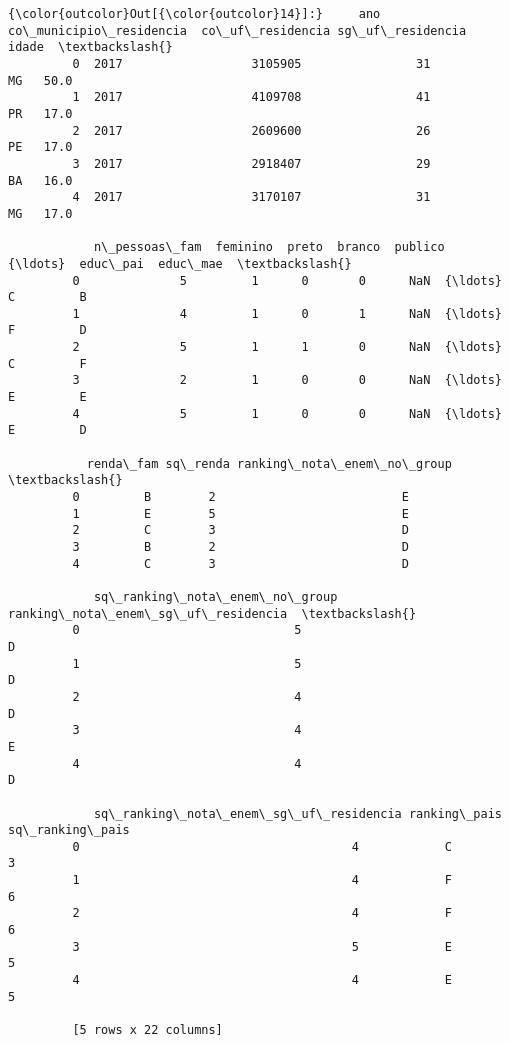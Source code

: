 \documentclass[11pt]{article}
\begin{document}
\begin{Verbatim}[commandchars=\\\{\}]
{\color{outcolor}Out[{\color{outcolor}14}]:}     ano  co\_municipio\_residencia  co\_uf\_residencia sg\_uf\_residencia  idade  \textbackslash{}
         0  2017                  3105905                31               MG   50.0   
         1  2017                  4109708                41               PR   17.0   
         2  2017                  2609600                26               PE   17.0   
         3  2017                  2918407                29               BA   16.0   
         4  2017                  3170107                31               MG   17.0   
         
            n\_pessoas\_fam  feminino  preto  branco  publico  {\ldots}  educ\_pai  educ\_mae  \textbackslash{}
         0              5         1      0       0      NaN  {\ldots}         C         B   
         1              4         1      0       1      NaN  {\ldots}         F         D   
         2              5         1      1       0      NaN  {\ldots}         C         F   
         3              2         1      0       0      NaN  {\ldots}         E         E   
         4              5         1      0       0      NaN  {\ldots}         E         D   
         
           renda\_fam sq\_renda ranking\_nota\_enem\_no\_group  \textbackslash{}
         0         B        2                          E   
         1         E        5                          E   
         2         C        3                          D   
         3         B        2                          D   
         4         C        3                          D   
         
            sq\_ranking\_nota\_enem\_no\_group ranking\_nota\_enem\_sg\_uf\_residencia  \textbackslash{}
         0                              5                                  D   
         1                              5                                  D   
         2                              4                                  D   
         3                              4                                  E   
         4                              4                                  D   
         
            sq\_ranking\_nota\_enem\_sg\_uf\_residencia ranking\_pais  sq\_ranking\_pais  
         0                                      4            C                3  
         1                                      4            F                6  
         2                                      4            F                6  
         3                                      5            E                5  
         4                                      4            E                5  
         
         [5 rows x 22 columns]
\end{Verbatim}
            
\end{document}
